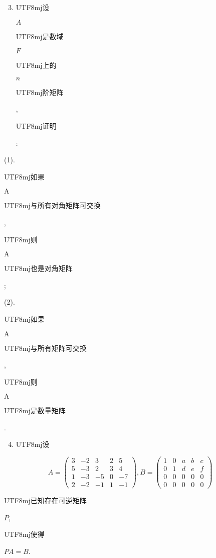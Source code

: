 \documentclass[10pt]{article}
\begin{document}
\begin{enumerate}
  \setcounter{enumi}{2}
  \item \begin{CJK}{UTF8}{mj}设\end{CJK} $A$ \begin{CJK}{UTF8}{mj}是数域\end{CJK} $F$ \begin{CJK}{UTF8}{mj}上的\end{CJK} $n$ \begin{CJK}{UTF8}{mj}阶矩阵\end{CJK}, \begin{CJK}{UTF8}{mj}证明\end{CJK}:
\end{enumerate}
(1). \begin{CJK}{UTF8}{mj}如果\end{CJK} $\mathrm{A}$ \begin{CJK}{UTF8}{mj}与所有对角矩阵可交换\end{CJK}, \begin{CJK}{UTF8}{mj}则\end{CJK} $\mathrm{A}$ \begin{CJK}{UTF8}{mj}也是对角矩阵\end{CJK};

(2). \begin{CJK}{UTF8}{mj}如果\end{CJK} $\mathrm{A}$ \begin{CJK}{UTF8}{mj}与所有矩阵可交换\end{CJK}, \begin{CJK}{UTF8}{mj}则\end{CJK} $\mathrm{A}$ \begin{CJK}{UTF8}{mj}是数量矩阵\end{CJK}.

\begin{enumerate}
  \setcounter{enumi}{3}
  \item \begin{CJK}{UTF8}{mj}设\end{CJK}
\end{enumerate}
$$
A=\left(\begin{array}{ccccc}
3 & -2 & 3 & 2 & 5 \\
5 & -3 & 2 & 3 & 4 \\
1 & -3 & -5 & 0 & -7 \\
2 & -2 & -1 & 1 & -1
\end{array}\right), B=\left(\begin{array}{ccccc}
1 & 0 & a & b & c \\
0 & 1 & d & e & f \\
0 & 0 & 0 & 0 & 0 \\
0 & 0 & 0 & 0 & 0
\end{array}\right)
$$
\begin{CJK}{UTF8}{mj}已知存在可逆矩阵\end{CJK} $P$, \begin{CJK}{UTF8}{mj}使得\end{CJK} $P A=B$.
\end{document}
